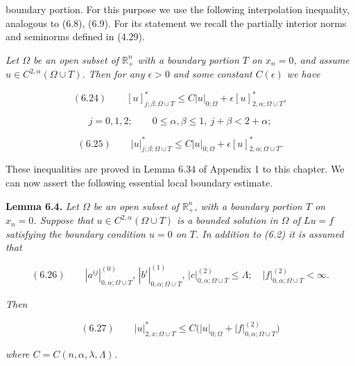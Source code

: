 


boundary portion. For this purpose we use the following interpolation inequality,
analogous to (6.8), (6.9). For its statement we recall the partially interior norms and
seminorms defined in (4.29).

\medskip

\noindent\textit{Let $\Omega$ be an open subset of $\mathbb{R}_+^n$ with a boundary portion $T$ on $x_n=0$, and assume
$u \in C^{2,\alpha}(\Omega \cup T)$. Then for any $\epsilon>0$ and some constant $C(\epsilon)$ we have}

\begin{equation}
(6.24)\qquad [u]^*_{j;\beta;\Omega \cup T}\le C|u|_{0;\Omega}+\epsilon [u]^*_{2,\alpha;\Omega \cup T},
\end{equation}

\[
j=0,1,2;\qquad 0\le \alpha,\beta\le 1,\ j+\beta<2+\alpha;
\]

\begin{equation}
(6.25)\qquad |u|^*_{j;\beta;\Omega \cup T}\le C|u|_{0;\Omega}+\epsilon [u]^*_{2,\alpha;\Omega \cup T}.
\end{equation}

\noindent These inequalities are proved in Lemma 6.34 of Appendix 1 to this chapter.
We can now assert the following essential local boundary estimate.

\medskip

\noindent\textbf{Lemma 6.4.} \quad \textit{Let $\Omega$ be an open subset of $\mathbb{R}_+^n$, with a boundary portion $T$ on $x_n=0$.
Suppose that $u \in C^{2,\alpha}(\Omega \cup T)$ is a bounded solution in $\Omega$ of $Lu=f$ satisfying the
boundary condition $u=0$ on $T$. In addition to (6.2) it is assumed that}

\begin{equation}
(6.26)\qquad |a^{ij}|^{(0)}_{0,\alpha;\Omega \cup T},\, |b^i|^{(1)}_{0,\alpha;\Omega \cup T},\, |c|^{(2)}_{0,\alpha;\Omega \cup T}\le \Lambda;\quad |f|^{(2)}_{0,\alpha;\Omega \cup T}<\infty.
\end{equation}

\noindent \textit{Then}

\begin{equation}
(6.27)\qquad |u|^*_{2,x;\Omega \cup T}\le C\bigl(|u|_{0;\Omega}+|f|^{(2)}_{0,\alpha;\Omega \cup T}\bigr)
\end{equation}

\noindent \textit{where $C=C(n,\alpha,\lambda,\Lambda)$.}

